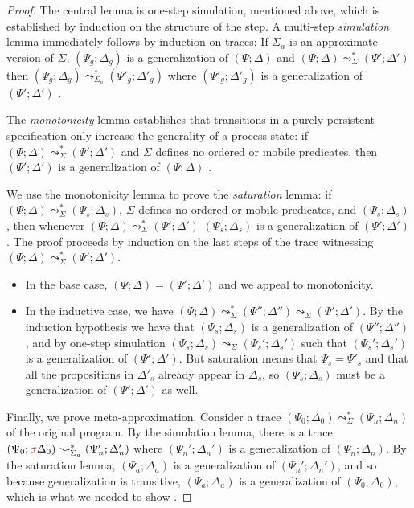 \begin{proof}
  The central lemma is one-step simulation, mentioned above, which is
  established by induction on the structure of the step. A multi-step
  {\it simulation} lemma immediately follows by induction on
  traces: If $\Sigma_a$ is an approximate version of $\Sigma$,
  $(\Psi_g; \Delta_g)$ is a generalization of $(\Psi; \Delta)$ and
  $(\Psi; \Delta) \leadsto^*_\Sigma (\Psi'; \Delta')$ then $(\Psi_g;
  \Delta_g) \leadsto^*_{\Sigma_a} (\Psi'_g; \Delta'_g)$ where
  $(\Psi'_g; \Delta'_g)$ is a generalization of $(\Psi'; \Delta')$
  \cite[Lemma 7]{simmons11logical}.

  The {\it monotonicity} lemma establishes that transitions in a
  purely-persistent specification only increase the generality of a
  process state: if $(\Psi; \Delta) \leadsto^*_\Sigma (\Psi';
  \Delta')$ and $\Sigma$ defines no ordered or mobile predicates, then
  $(\Psi'; \Delta')$ is a generalization of $(\Psi; \Delta)$
  \cite[Lemma 8]{simmons11logical}.

  We use the monotonicity lemma to prove the {\it saturation} lemma:
  if $(\Psi; \Delta) \leadsto^*_\Sigma (\Psi_s; \Delta_s)$, $\Sigma$
  defines no ordered or mobile predicates, and $(\Psi_s; \Delta_s)$,
  then whenever $(\Psi; \Delta) \leadsto^*_\Sigma (\Psi'; \Delta')$
  $(\Psi_s; \Delta_s)$ is a generalization of $(\Psi'; \Delta')$. The
  proof proceeds by induction on the last steps of the trace
  witnessing $(\Psi; \Delta) \leadsto^*_\Sigma (\Psi'; \Delta')$.
  \begin{itemize}
  \item In the base case, $(\Psi; \Delta) = (\Psi'; \Delta')$ and we
    appeal to monotonicity.

  \item In the inductive case, we have $(\Psi; \Delta)
    \leadsto^*_\Sigma (\Psi''; \Delta'') \leadsto_\Sigma (\Psi';
    \Delta')$.  By the induction hypothesis we have that $(\Psi_s;
    \Delta_s)$ is a generalization of $(\Psi''; \Delta'')$, and by
    one-step simulation $(\Psi_s; \Delta_s) \leadsto_\Sigma (\Psi_s';
    \Delta_s')$ such that $(\Psi_s'; \Delta_s')$ is a generalization
    of $(\Psi'; \Delta')$. But saturation means that $\Psi_s =
    \Psi'_s$ and that all the propositions in $\Delta'_s$ already
    appear in $\Delta_s$, so $(\Psi_s; \Delta_s)$ must be a
    generalization of $(\Psi'; \Delta')$ as well. \cite[Lemma
    9]{simmons11logical}
  \end{itemize}

  Finally, we prove meta-approximation. Consider a trace $(\Psi_0;
  \Delta_0) \leadsto^*_\Sigma (\Psi_n; \Delta_n)$ of the original
  program. By the simulation lemma, there is a trace $(\Psi_0;
  {\lf\sigma}\Delta_0) \leadsto^*_{\Sigma_a} (\Psi_n'; \Delta_n')$ where
  $(\Psi_n'; \Delta_n')$ is a generalization of $(\Psi_n; \Delta_n)$.
  By the saturation lemma, $(\Psi_a; \Delta_a)$ is a generalization of
  $(\Psi_n'; \Delta_n')$, and so because generalization is transitive,
  $(\Psi_a; \Delta_a)$ is a generalization of $(\Psi_0; \Delta_0)$,
  which is what we needed to show \cite[Theorem 3]{simmons11logical}.
\end{proof}

